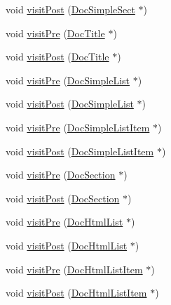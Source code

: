 \begin{DoxyCompactItemize}
\item 
void \hyperlink{class_docbook_doc_visitor_a5d5da278a3d2dadbaa6b4e47c95d6a97}{visit\+Post} (\hyperlink{class_doc_simple_sect}{Doc\+Simple\+Sect} $\ast$)
\item 
void \hyperlink{class_docbook_doc_visitor_ac7f30451366ae3f849f04a70594f107a}{visit\+Pre} (\hyperlink{class_doc_title}{Doc\+Title} $\ast$)
\item 
void \hyperlink{class_docbook_doc_visitor_aa7fbff6b62698211edb15058ac2e361d}{visit\+Post} (\hyperlink{class_doc_title}{Doc\+Title} $\ast$)
\item 
void \hyperlink{class_docbook_doc_visitor_aab4c02211f9ac901bb2860dbb0e81558}{visit\+Pre} (\hyperlink{class_doc_simple_list}{Doc\+Simple\+List} $\ast$)
\item 
void \hyperlink{class_docbook_doc_visitor_acfea9937da583aa0ab29c3770acf58a5}{visit\+Post} (\hyperlink{class_doc_simple_list}{Doc\+Simple\+List} $\ast$)
\item 
void \hyperlink{class_docbook_doc_visitor_ad55f15d7eeb028539b1c72d9dd01a20d}{visit\+Pre} (\hyperlink{class_doc_simple_list_item}{Doc\+Simple\+List\+Item} $\ast$)
\item 
void \hyperlink{class_docbook_doc_visitor_a9942931a55fae39c0eb930611d9022b1}{visit\+Post} (\hyperlink{class_doc_simple_list_item}{Doc\+Simple\+List\+Item} $\ast$)
\item 
void \hyperlink{class_docbook_doc_visitor_ac9ce379e3769a5fba4233f116b5b91fe}{visit\+Pre} (\hyperlink{class_doc_section}{Doc\+Section} $\ast$)
\item 
void \hyperlink{class_docbook_doc_visitor_a8562831310481738e09213611d0a888c}{visit\+Post} (\hyperlink{class_doc_section}{Doc\+Section} $\ast$)
\item 
void \hyperlink{class_docbook_doc_visitor_a8c7d0fe4210ce1e321a4d9d2c0294f2e}{visit\+Pre} (\hyperlink{class_doc_html_list}{Doc\+Html\+List} $\ast$)
\item 
void \hyperlink{class_docbook_doc_visitor_ac130923e3eaeec0cb84e4e54ae515ed5}{visit\+Post} (\hyperlink{class_doc_html_list}{Doc\+Html\+List} $\ast$)
\item 
void \hyperlink{class_docbook_doc_visitor_a502abaac790e529f665705f715828004}{visit\+Pre} (\hyperlink{class_doc_html_list_item}{Doc\+Html\+List\+Item} $\ast$)
\item 
void \hyperlink{class_docbook_doc_visitor_af486272ad37fc48c21cb74951257ccf8}{visit\+Post} (\hyperlink{class_doc_html_list_item}{Doc\+Html\+List\+Item} $\ast$)
\item 

\end{DoxyCompactItemize}
